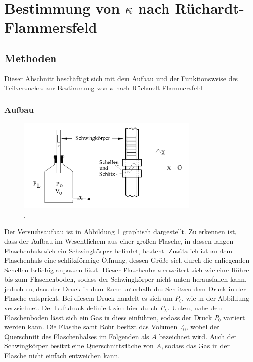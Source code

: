 \section{Bestimmung von $\kappa$ nach Rüchardt-Flammersfeld}
	
	\subsection{Methoden}
		
		Dieser Abschnitt beschäftigt sich mit dem Aufbau und der Funktionsweise des Teilversuches zur Bestimmung von $\kappa$ nach Rüchardt-Flammersfeld.
	
		\subsubsection{Aufbau}
		
			\begin{figure}[ht]
				\centering
				\includegraphics[width=0.8\textwidth]{bilder/aufbau_v1.png}
				\caption{.\cite{WWU}} %
				\label{fig:AufbauV1}	
			\end{figure}
			Der Versuchsaufbau ist in Abbildung \ref{fig:AufbauV1} graphisch dargestellt.
			Zu erkennen ist, dass der Aufbau im Wesentlichem aus einer großen Flasche, in dessen langen Flaschenhals sich ein Schwingkörper befindet, besteht.
			Zusätzlich ist an dem Flaschenhals eine schlitzförmige Öffnung, dessen Größe sich durch die anliegenden Schellen beliebig anpassen lässt.
			Dieser Flaschenhals erweitert sich wie eine Röhre bis zum Flaschenboden, sodass der Schwingkörper nicht unten herausfallen kann, jedoch so, dass der Druck in dem Rohr unterhalb des Schlitzes dem Druck in der Flasche entspricht.		
			Bei diesem Druck handelt es sich um $P_0$, wie in der Abbildung verzeichnet. 
			Der Luftdruck definiert sich hier durch $P_L$.
			Unten, nahe dem Flaschenboden lässt sich ein Gas in diese einführen, sodass der Druck $P_0$ variiert werden kann.
			Die Flasche samt Rohr besitzt das Volumen $V_0$, wobei der Querschnitt des Flaschenhalses im Folgenden als $A$ bezeichnet wird. 
			Auch der Schwingkörper besitzt eine Querschnittsfläche von $A$, sodass das Gas in der Flasche nicht einfach entweichen kann. 
			
